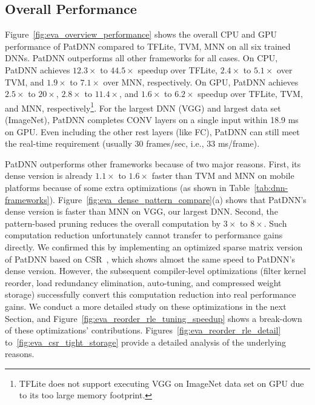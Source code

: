 \documentclass[sigplan,screen]{acmart}
\begin{document}
\subsection{Overall Performance}





Figure~\ref{fig:eva_overview_performance} shows the overall CPU and GPU performance of PatDNN compared to TFLite, TVM, MNN on all six trained DNNs. PatDNN outperforms all other frameworks for all cases. 
On CPU, PatDNN achieves $12.3\times$ to $44.5\times$ speedup over TFLite, $2.4\times$ to $5.1\times$ over TVM, and $1.9\times$ to $7.1\times$ over MNN, respectively. On GPU, PatDNN achieves $2.5\times$ to $20\times$, $2.8\times$ to $11.4\times$, and $1.6\times$ to $6.2\times$ speedup over TFLite, TVM, and MNN, respectively\footnote{TFLite does not support executing VGG on ImageNet data set on GPU due to its too large memory footprint.}. For the largest DNN (VGG) and largest data set (ImageNet), PatDNN completes CONV layers on a single input  within 
18.9 ms on GPU.
Even including the other rest layers (like FC), PatDNN can still meet the real-time requirement (usually 30 frames/sec, 
i.e., 33 ms/frame).






PatDNN outperforms other frameworks because of two major reasons. First, its dense version is already $1.1\times$ to $1.6\times$ faster than TVM and MNN on mobile platforms because of some extra optimizations (as shown in Table~\ref{tab:dnn-frameworks}). Figure~\ref{fig:eva_dense_pattern_compare}(a) shows that PatDNN's dense version is faster than MNN on VGG, our largest DNN. Second, the pattern-based pruning reduces the overall computation by $3\times$ to $8\times$. Such computation reduction unfortunately cannot transfer to performance gains directly. We confirmed this by implementing an optimized sparse matrix version of PatDNN based on CSR~\cite{greathouse2016clsparse}, which shows almost the same speed to PatDNN's dense version. However, the subsequent compiler-level optimizations (filter kernel reorder, load redundancy elimination, auto-tuning, and compressed weight storage) successfully convert this computation reduction into real performance gains. We conduct a more detailed study on these optimizations in the next Section, and Figure~\ref{fig:eva_reorder_rle_tuning_speedup} shows a break-down of these optimizations’ contributions. Figures~\ref{fig:eva_reorder_rle_detail} to~\ref{fig:eva_csr_tight_storage} provide a detailed analysis of the underlying reasons. 
\end{document}
